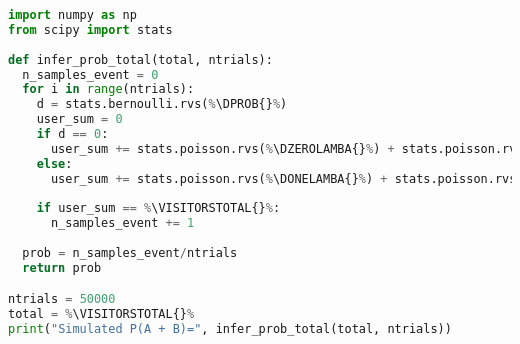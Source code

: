 \begin{lstlisting}[escapechar=\%, language=python,frame=single]
import numpy as np
from scipy import stats
		
def infer_prob_total(total, ntrials):		
  n_samples_event = 0
  for i in range(ntrials):
    d = stats.bernoulli.rvs(%\DPROB{}%)
    user_sum = 0			
    if d == 0:
      user_sum += stats.poisson.rvs(%\DZEROLAMBA{}%) + stats.poisson.rvs(%\DZEROLAMBB{}%)
    else:
      user_sum += stats.poisson.rvs(%\DONELAMBA{}%) + stats.poisson.rvs(%\DONELAMBB{}%)
		
    if user_sum == %\VISITORSTOTAL{}%:
      n_samples_event += 1
		
  prob = n_samples_event/ntrials
  return prob

ntrials = 50000
total = %\VISITORSTOTAL{}%
print("Simulated P(A + B)=", infer_prob_total(total, ntrials))
\end{lstlisting}

